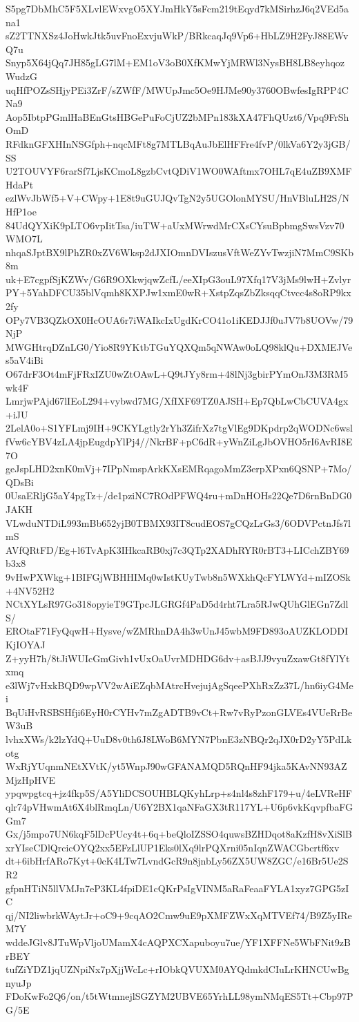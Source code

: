 S5pg7DbMhC5F5XLvlEWxvgO5XYJmHkY5sFcm219tEqyd7kMSirhzJ6q2VEd5ana1
sZ2TTNXSz4JoHwkJtk5uvFnoExvjuWkP/BRkcaqJq9Vp6+HbLZ9H2FyJ88EWvQ7u
Snyp5X64jQq7JH85gLG7lM+EM1oV3oB0XfKMwYjMRWl3NysBH8LB8eyhqozWudzG
uqHfPOZsSHjyPEi3ZrF/sZWfF/MWUpJmc5Oe9HJMe90y3760OBwfesIgRPP4CNa9
Aop5IbtpPGmlHaBEnGtsHBGePuFoCjUZ2bMPn183kXA47FhQUzt6/Vpq9FrShOmD
RFdknGFXHInNSGfph+nqcMFt8g7MTLBqAuJbElHFFre4fvP/0lkVa6Y2y3jGB/SS
U2TOUVYF6rarSf7LjsKCmoL8gzbCvtQDiV1WO0WAftmx7OHL7qE4uZB9XMFHdaPt
ezlWvJbWf5+V+CWpy+1E8t9uGUJQvTgN2y5UGOlonMYSU/HnVBluLH2S/NHfP1oe
84UdQYXiK9pLTO6vpIitTsa/iuTW+aUxMWrwdMrCXsCYsuBpbmgSwsVzv70WMO7L
nhqaSJptBX9lPhZR0xZV6Wksp2dJXIOmnDVIszusVftWeZYvTwzjiN7MmC9SKb8m
uk+E7cgpfSjKZWv/G6R9OXkwjqwZcfL/eeXIpG3ouL97Xfq17V3jMs9lwH+Zvlyr
PY+5YahDFCU35blVqmh8KXPJw1xmE0wR+XstpZqsZbZksqqCtvcc4s8oRP9kx2fy
OPy7VB3QZkOX0HcOUA6r7iWAIkcIxUgdKrCO41o1iKEDJJf0uJV7b8UOVw/79NjP
MWGHtrqDZnLG0/Yio8R9YKtbTGuYQXQm5qNWAw0oLQ98klQu+DXMEJVes5aV4iBi
O67drF3Ot4mFjFRxIZU0wZtOAwL+Q9tJYy8rm+48lNj3gbirPYmOnJ3M3RM5wk4F
LmrjwPAjd67lIEoL294+vybwd7MG/XfIXF69TZ0AJSH+Ep7QbLwCbCUVA4gx+iJU
2LelA0o+S1YFLmj9IH+9CKYLgtly2rYh3ZifrXz7tgVlEg9DKpdrp2qWODNc6wsl
fVw6cYBV4zLA4jpEugdpYlPj4//NkrBF+pC6dR+yWnZiLgJbOVHO5rI6AvRI8E7O
geJspLHD2xnK0mVj+7IPpNmspArkKXsEMRqagoMmZ3erpXPxn6QSNP+7Mo/QDsBi
0UsaERljG5aY4pgTz+/de1pziNC7ROdPFWQ4ru+mDnHOHs22Qe7D6rnBnDG0JAKH
VLwduNTDiL993mBb652yjB0TBMX93IT8cudEOS7gCQzLrGs3/6ODVPctnJfs7lmS
AVfQRtFD/Eg+l6TvApK3IHkcaRB0xj7c3QTp2XADhRYR0rBT3+LICchZBY69b3x8
9vHwPXWkg+1BIFGjWBHHIMq0wIstKUyTwb8n5WXkhQcFYLWYd+mIZOSk+4NV52H2
NCtXYLsR97Go318opyieT9GTpcJLGRGf4PaD5d4rht7Lra5RJwQUhGlEGn7ZdlS/
EROtaF71FyQqwH+Hysve/wZMRhnDA4h3wUnJ45wbM9FD893oAUZKLODDIKjIOYAJ
Z+yyH7h/8tJiWUIcGmGivh1vUxOaUvrMDHDG6dv+asBJJ9vyuZxawGt8fYlYtxmq
e3lWj7vHxkBQD9wpVV2wAiEZqbMAtrcHvejujAgSqeePXhRxZz37L/hn6iyG4Mei
BqUiHvRSBSHfji6EyH0rCYHv7mZgADTB9vCt+Rw7vRyPzonGLVEs4VUeRrBeW3uB
lvhxXWs/k2lzYdQ+UuD8v0th6J8LWoB6MYN7PbnE3zNBQr2qJX0rD2yY5PdLkotg
WxRjYUqnmNEtXVtK/yt5WnpJ90wGFANAMQD5RQnHF94jka5KAvNN93AZMjzHpHVE
ypqwpgtcq+jz4fkp5S/A5YliDCSOUHBLQKyhLrp+s4nl4s8zhF179+u/4eLVReHF
qlr74pVHwmAt6X4blRmqLn/U6Y2BX1qaNFaGX3tR117YL+U6p6vkKqvpfbaFGGm7
Gx/j5mpo7UN6kqF5lDcPUcy4t+6q+beQloIZSSO4quwsBZHDqot8aKzfH8vXiSlB
xrYIseCDlQrcicOYQ2xx5EFzLlUP1Eks0lXq9lrPQXrni05nIqnZWACGbcrtf6xv
dt+6ibHrfARo7Kyt+0cK4LTw7LvndGcR9n8jnbLy56ZX5UW8ZGC/e16Br5Ue2SR2
gfpnHTiN5llVMJn7eP3KL4fpiDE1cQKrPsIgVINM5aRaFeaaFYLA1xyz7GPG5zIC
qj/NI2liwbrkWAytJr+oC9+9cqAO2Cmw9uE9pXMFZWxXqMTVEf74/B9Z5yIReM7Y
wddeJGlv8JTuWpVljoUMamX4cAQPXCXapuboyu7ue/YF1XFFNe5WbFNit9zBrBEY
tufZiYDZ1jqUZNpiNx7pXjjWcLc+rIObkQVUXM0AYQdmkdCIuLrKHNCUwBgnyuJp
FDoKwFo2Q6/on/t5tWtmnejlSGZYM2UBVE65YrhLL98ymNMqES5Tt+Cbp97PG/5E
